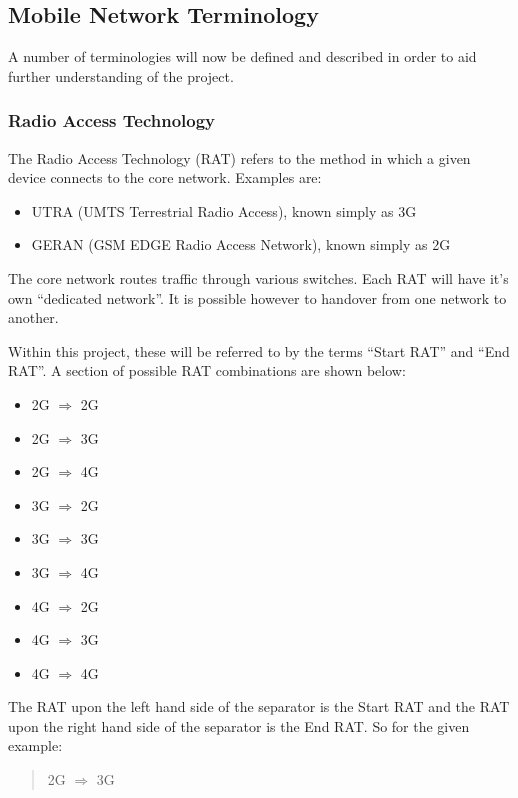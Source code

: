 \subsection{Mobile Network Terminology}
\label{sec:mobile_network_terminology}
A number of terminologies will now be defined and described in order to aid 
further understanding of the project.

\subsubsection{Radio Access Technology}
The Radio Access Technology (RAT) refers to the method in which a given device 
connects to the core network. Examples are:
\begin{itemize}
  \item UTRA (UMTS Terrestrial Radio Access), known simply as 3G
  \item GERAN (GSM EDGE Radio Access Network), known simply as 2G
\end{itemize}

The core network routes traffic through various switches. Each RAT will have 
it's own ``dedicated network''. It is possible however to handover from one 
network to another.

Within this project, these will be referred to by the terms ``Start RAT'' and 
``End RAT''. A section of possible RAT combinations are shown below:
\begin{multicols}{3}
  \begin{itemize}
    \item 2G $\Rightarrow$ 2G
    \item 2G $\Rightarrow$ 3G
    \item 2G $\Rightarrow$ 4G
    \item 3G $\Rightarrow$ 2G
    \item 3G $\Rightarrow$ 3G
    \item 3G $\Rightarrow$ 4G
    \item 4G $\Rightarrow$ 2G
    \item 4G $\Rightarrow$ 3G
    \item 4G $\Rightarrow$ 4G
  \end{itemize}
\end{multicols}

The RAT upon the left hand side of the separator is the Start RAT and the RAT 
upon the right hand side of the separator is the End RAT. So for the given 
example:

\begin{quote}
  2G $\Rightarrow$ 3G
\end{quote}

